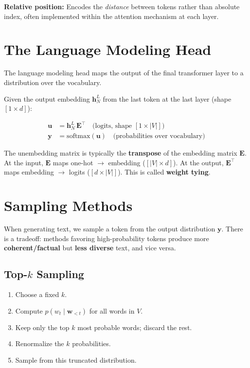 \documentclass[main.tex]{subfiles}
\begin{document}
\textbf{Relative position:} Encodes the \emph{distance} between tokens rather than absolute index, often implemented within the attention mechanism at each layer.

\section{The Language Modeling Head}

The language modeling head maps the output of the final transformer layer to a distribution over the vocabulary.

Given the output embedding $\mathbf{h}_N^L$ from the last token at the last layer (shape $[1 \times d]$):

\begin{align}
\mathbf{u} &= \mathbf{h}_N^L \, \mathbf{E}^\top \quad \text{(logits, shape } [1 \times |V|]\text{)} \tag{8.46} \\[6pt]
\mathbf{y} &= \text{softmax}(\mathbf{u}) \quad \text{(probabilities over vocabulary)} \tag{8.47}
\end{align}

\begin{remark}
The unembedding matrix is typically the \textbf{transpose} of the embedding matrix $\mathbf{E}$. At the input, $\mathbf{E}$ maps one-hot $\to$ embedding ($[|V| \times d]$). At the output, $\mathbf{E}^\top$ maps embedding $\to$ logits ($[d \times |V|]$). This is called \textbf{weight tying}.
\end{remark}

\section{Sampling Methods}

When generating text, we sample a token from the output distribution $\mathbf{y}$. There is a tradeoff: methods favoring high-probability tokens produce more \textbf{coherent/factual} but \textbf{less diverse} text, and vice versa.

\subsection{Top-$k$ Sampling}

\begin{enumerate}
    \item Choose a fixed $k$.
    \item Compute $p(w_t \mid \mathbf{w}_{<t})$ for all words in $V$.
    \item Keep only the top $k$ most probable words; discard the rest.
    \item Renormalize the $k$ probabilities.
    \item Sample from this truncated distribution.
\end{enumerate}
\end{document}
